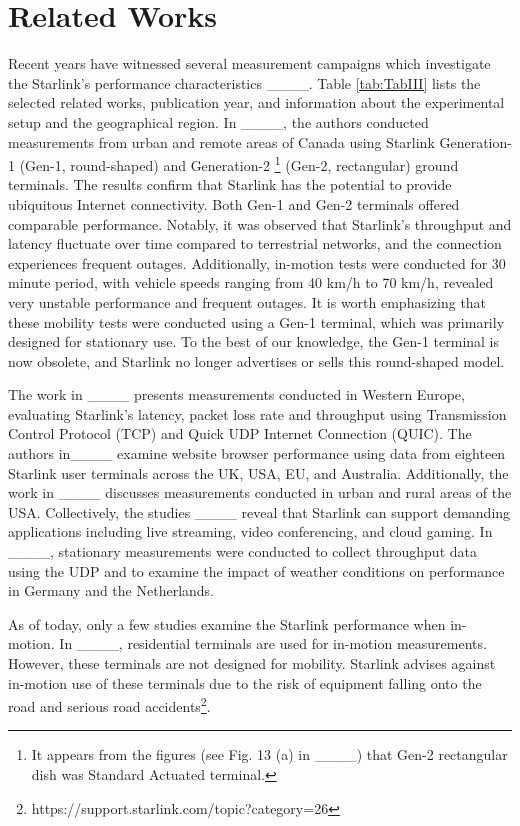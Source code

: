 \section{Related Works}
Recent years have witnessed several measurement campaigns which investigate the Starlink's performance characteristics ____. Table \ref{tab:TabIII} lists the selected related works, publication year, and information about the experimental setup and the geographical region. In ____, the authors conducted measurements from urban and remote areas of Canada using Starlink Generation-1 (Gen-1, round-shaped) and Generation-2 \footnote{It appears from the figures (see Fig. 13 (a) in ____) that Gen-2 rectangular dish was Standard Actuated terminal.} (Gen-2, rectangular) ground terminals. The results confirm that Starlink has the potential to provide ubiquitous Internet connectivity. Both Gen-1 and Gen-2 terminals offered comparable performance. Notably, it was observed that Starlink's throughput and latency fluctuate over time compared to terrestrial networks, and the connection experiences frequent outages. Additionally, in-motion tests were conducted for 30 minute period, with vehicle speeds ranging from 40 km/h to 70 km/h, revealed very unstable performance and frequent outages. It is worth emphasizing that these mobility tests were conducted using a Gen-1 terminal, which was primarily designed for stationary use. To the best of our knowledge, the Gen-1 terminal is now obsolete, and Starlink no longer advertises or sells this round-shaped model. 

The work in ____ presents measurements conducted in Western Europe, evaluating Starlink's  latency, packet loss rate and throughput using Transmission Control Protocol 
 (TCP) and Quick UDP Internet Connection (QUIC). The authors in____ examine website browser performance using data from eighteen Starlink user terminals across the UK, USA, EU, and Australia. Additionally, the work in ____ discusses measurements conducted in urban and rural areas of the USA. Collectively, the studies ____ reveal that Starlink can support demanding applications including live streaming, video conferencing, and cloud gaming. In ____, stationary measurements were conducted to collect throughput data using the UDP and to examine the impact of weather conditions on performance in Germany and the Netherlands.

As of today, only a few studies examine the Starlink performance when in-motion. In ____, residential terminals are used for in-motion measurements. However, these terminals are not designed for mobility. Starlink advises against in-motion use of these terminals due to the risk of equipment falling onto the road and serious road accidents\footnote{https://support.starlink.com/topic?category=26}.


